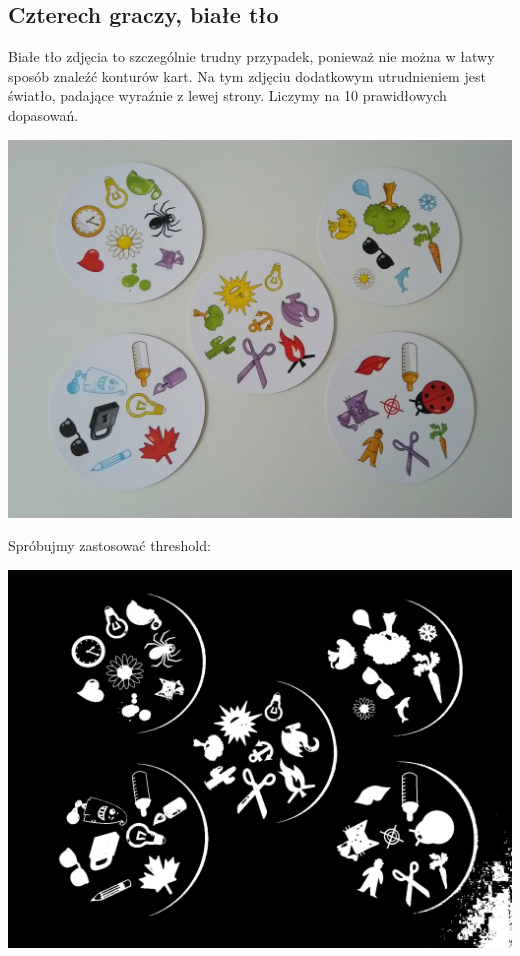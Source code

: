 \documentclass[10pt,a4paper]{article}
\begin{document}
\subsection{Czterech graczy, białe tło}
Białe tło zdjęcia to szczególnie trudny przypadek, ponieważ nie można w łatwy sposób znaleźć konturów kart. Na tym zdjęciu dodatkowym utrudnieniem jest światło, padające wyraźnie z lewej strony. Liczymy na 10 prawidłowych dopasowań.
\begin{center}
\includegraphics[scale=0.25]{2.3/dobble14.jpg}
\end{center}
Spróbujmy zastosować threshold:
\begin{center}
\includegraphics[scale=0.25]{2.3/th1.jpg}
\end{center}
\end{document}
